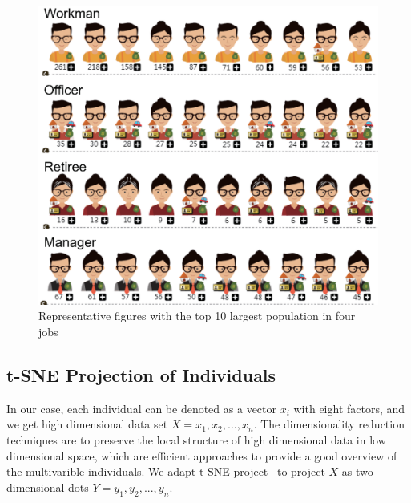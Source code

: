 
\begin{figure}[htb!]
 \centering %
 \includegraphics[width=\columnwidth]{pictures/design_example}
 \caption{Representative figures with the top 10 largest population in four jobs}
 \label{fig:div_example}
\end{figure}

\subsection{t-SNE Projection of Individuals}




In our case, each individual can be denoted as a vector $x_i$ with eight factors, and we get high dimensional data set $X={x_1, x_2, ..., x_n}$. The dimensionality reduction techniques are to preserve the local structure of high dimensional data in low dimensional space, which are efficient approaches to provide a good overview of the multivarible individuals. We adapt t-SNE project~\cite{maaten2008visualizing} to project $X$ as two-dimensional dots $Y={y_1, y_2, ..., y_n}$. 

